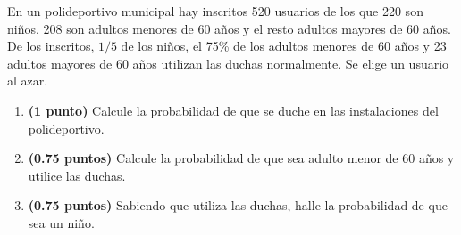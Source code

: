 
En un polideportivo municipal hay inscritos 520 usuarios de los que 220 son niños, 208 son adultos menores de 60 años y el resto adultos mayores de 60 años. De los inscritos, $1/5$ de los niños, el 75\% de los adultos menores de 60 años y 23 adultos mayores de 60 años utilizan las duchas normalmente. Se elige un usuario al azar.
\begin{enumerate}[label=\alph*)]
\item \textbf{(1 punto)} Calcule la probabilidad de que se duche en las instalaciones del polideportivo.
\item \textbf{(0.75 puntos)} Calcule la probabilidad de que sea adulto menor de 60 años y utilice las duchas.
\item \textbf{(0.75 puntos)} Sabiendo que utiliza las duchas, halle la probabilidad de que sea un niño.
\end{enumerate}
